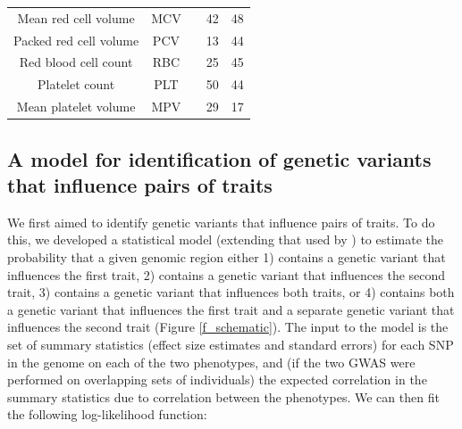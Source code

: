 \documentclass[11pt,titlepage]{article}
\begin{document}
\begin{table}[htp]
\begin{center}
{\begin{tabular}{|c|c| C{3.5cm}| C{2cm}| C{3cm}| }
Mean red cell volume & MCV & \citep{van2012seventy} & 42 & 48 \\
Packed red cell volume & PCV & \citep{van2012seventy} & 13 & 44\\
Red blood cell count & RBC & \citep{van2012seventy} & 25  & 45 \\ 
Platelet count & PLT &  \citep{gieger2011new} & 50 & 44 \\ 
Mean platelet volume & MPV &  \citep{gieger2011new} & 29 & 17 \\ 
\hline
\end{tabular}
} 
\end{center}
\label{table_phenos}
\end{table}


\subsection{A model for identification of genetic variants that influence pairs of traits}

We first aimed to identify genetic variants that influence pairs of traits. 
To do this, we developed a statistical model (extending that used by \citet{Giambartolomei:2014aa}) to estimate the probability that a given genomic region either 1) contains a genetic variant that influences the first trait, 2) contains a genetic variant that influences the second trait, 3) contains a genetic variant that influences both traits, or 4) contains both a genetic variant that influences the first trait and a separate genetic variant that influences the second trait (Figure \ref{f_schematic}). 
The input to the model is the set of summary statistics (effect size estimates and standard errors) for each SNP in the genome on each of the two phenotypes, and (if the two GWAS were performed on overlapping sets of individuals) the expected correlation in the summary statistics due to correlation between the phenotypes.  
We can then fit the following log-likelihood function:
\end{document}
